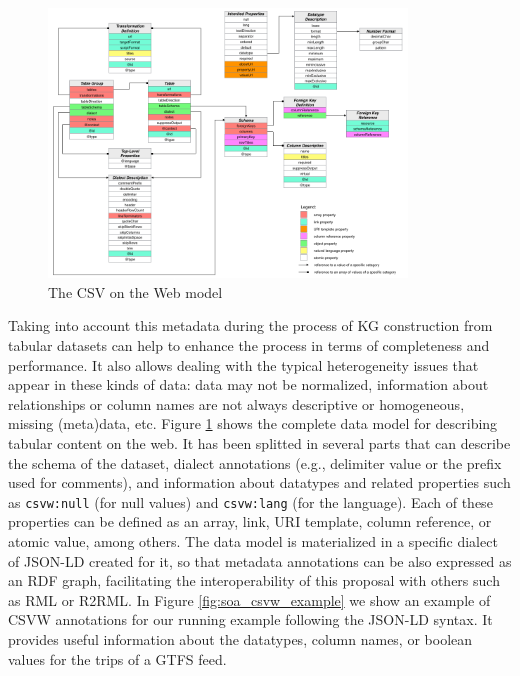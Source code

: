 \begin{figure}[!ht]
\centering
\includegraphics[width=0.85\textwidth]{figures/state-of-the-art/csvw-model.png}
\caption{The CSV on the Web model~\citep{tennison2015model}}
\label{fig:soa_csvw}
\end{figure}


Taking into account this metadata during the process of KG construction from tabular datasets can help to enhance the process in terms of completeness and performance. It also allows dealing with the typical heterogeneity issues that appear in these kinds of data: data may not be normalized, information about relationships or column names are not always descriptive or homogeneous, missing (meta)data, etc. Figure \ref{fig:soa_csvw} shows the complete data model for describing tabular content on the web. It has been splitted in several parts that can describe the schema of the dataset, dialect annotations (e.g., delimiter value or the prefix used for comments), and information about datatypes and related properties such as \texttt{csvw:null} (for null values) and \texttt{csvw:lang} (for the language). Each of these properties can be defined as an array, link, URI template, column reference, or atomic value, among others. The data model is materialized in a specific dialect of JSON-LD created for it, so that metadata annotations can be also expressed as an RDF graph, facilitating the interoperability of this proposal with others such as RML or R2RML. In Figure \ref{fig:soa_csvw_example} we show an example of CSVW annotations for our running example following the JSON-LD syntax. It provides useful information about the datatypes, column names, or boolean values for the trips of a GTFS feed.

